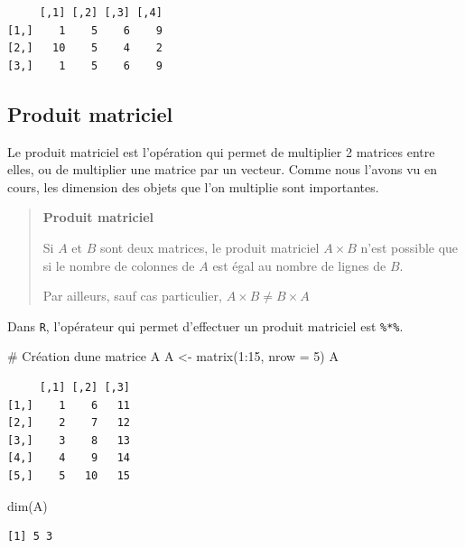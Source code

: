 \documentclass[
  french,
  a4paper,
  DIV=11,
  numbers=noendperiod,
  oneside]{scrreprt}
\newenvironment{Shaded}{}{}
\newcommand{\AttributeTok}[1]{\textcolor[rgb]{0.84,0.23,0.29}{#1}}
\newcommand{\CommentTok}[1]{\textcolor[rgb]{0.42,0.45,0.49}{#1}}
\newcommand{\DecValTok}[1]{\textcolor[rgb]{0.00,0.36,0.77}{#1}}
\newcommand{\FunctionTok}[1]{\textcolor[rgb]{0.44,0.26,0.76}{#1}}
\newcommand{\NormalTok}[1]{\textcolor[rgb]{0.14,0.16,0.18}{#1}}
\newcommand{\OtherTok}[1]{\textcolor[rgb]{0.44,0.26,0.76}{#1}}
\newcommand{\SpecialCharTok}[1]{\textcolor[rgb]{0.00,0.36,0.77}{#1}}
\begin{document}
\begin{tcolorbox}
\begin{verbatim}
     [,1] [,2] [,3] [,4]
[1,]    1    5    6    9
[2,]   10    5    4    2
[3,]    1    5    6    9
\end{verbatim}

\subsection{Produit matriciel}\label{produit-matriciel}

Le produit matriciel est l'opération qui permet de multiplier 2 matrices
entre elles, ou de multiplier une matrice par un vecteur. Comme nous
l'avons vu en cours, les dimension des objets que l'on multiplie sont
importantes.

\begin{quote}
\textbf{Produit matriciel}

Si \(A\) et \(B\) sont deux matrices, le produit matriciel \(A\times B\)
n'est possible que si le nombre de colonnes de \(A\) est égal au nombre
de lignes de \(B\).

Par ailleurs, sauf cas particulier, \(A\times B \neq B\times A\)
\end{quote}

Dans \texttt{R}, l'opérateur qui permet d'effectuer un produit matriciel
est \texttt{\%*\%}.

\begin{Shaded}
\begin{Highlighting}[]
\CommentTok{\# Création d\textquotesingle{}une matrice A}
\NormalTok{A }\OtherTok{\textless{}{-}} \FunctionTok{matrix}\NormalTok{(}\DecValTok{1}\SpecialCharTok{:}\DecValTok{15}\NormalTok{, }\AttributeTok{nrow =} \DecValTok{5}\NormalTok{)}
\NormalTok{A}
\end{Highlighting}
\end{Shaded}

\begin{verbatim}
     [,1] [,2] [,3]
[1,]    1    6   11
[2,]    2    7   12
[3,]    3    8   13
[4,]    4    9   14
[5,]    5   10   15
\end{verbatim}

\begin{Shaded}
\begin{Highlighting}[]
\FunctionTok{dim}\NormalTok{(A)}
\end{Highlighting}
\end{Shaded}

\begin{verbatim}
[1] 5 3
\end{verbatim}


\end{tcolorbox}
\end{document}
